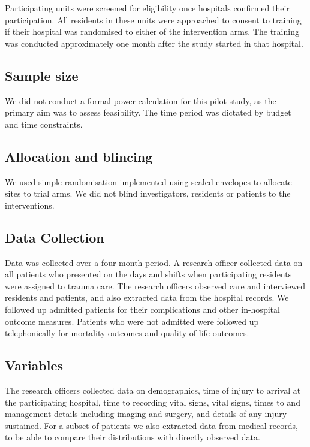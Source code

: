 \documentclass[
]{article}
\begin{document}
Participating units were screened for eligibility once hospitals confirmed their participation. All residents in these units were approached to consent to training if their hospital was randomised to either of the intervention arms. The training was conducted approximately one month after the study started in that hospital.

\hypertarget{sample-size}{%
\subsection{Sample size}\label{sample-size}}

We did not conduct a formal power calculation for this pilot study, as the primary aim was to assess feasibility. The time period was dictated by budget and time constraints.

\hypertarget{allocation-and-blincing}{%
\subsection{Allocation and blincing}\label{allocation-and-blincing}}

We used simple randomisation implemented using sealed envelopes to allocate sites to trial arms. We did not blind investigators, residents or patients to the interventions.

\hypertarget{data-collection}{%
\subsection{Data Collection}\label{data-collection}}

Data was collected over a four-month period. A research officer collected data on all patients who presented on the days and shifts when participating residents were assigned to trauma care. The research officers observed care and interviewed residents and patients, and also extracted data from the hospital records. We followed up admitted patients for their complications and other in-hospital outcome measures. Patients who were not admitted were followed up telephonically for mortality outcomes and quality of life outcomes.

\hypertarget{variables}{%
\subsection{Variables}\label{variables}}

The research officers collected data on demographics, time of injury to arrival at the participating hospital, time to recording vital signs, vital signs, times to and management details including imaging and surgery, and details of any injury sustained. For a subset of patients we also extracted data from medical records, to be able to compare their distributions with directly observed data.
\end{document}
